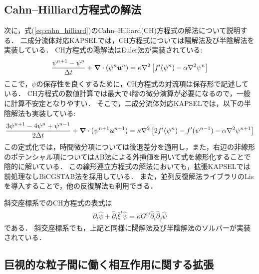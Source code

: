 \documentclass[pdflatex,a4paper,10pt,ja=standard]{bxjsarticle}
\def\vec#1{\mbox{\boldmath $#1$}}
\begin{document}
\subsection{Cahn--Hilliard方程式の解法}
\label{sec:cahn_hilliard_solver}
次に，式(\ref{eq:cahn_hilliard})のCahn--Hilliard(CH)方程式の解法について説明する．
二成分流体対応KAPSELでは，CH方程式については陽解法及び半陰解法を実装している．
CH方程式の陽解法はEuler法が実装されている:
\begin{align}
    \frac{\psi^{n+1} - \psi^{n}}{\Delta t} + \vec{\nabla} \cdot (\psi^{n} \vec{u}^{n}) = \kappa \nabla ^2 \left[f'(\psi^{n}) - \alpha \nabla^2 \psi^{n} \right]
\end{align}
ここで，$\psi$の保存性を良くするために，CH方程式の対流項は保存形で記述している．
CH方程式の数値計算では最大で4階の微分演算が必要になるので，一般に計算不安定となりやすい．
そこで，二成分流体対応KAPSELでは，以下の半陰解法も実装している\autocite{he2007large}:
\begin{align}
    \frac{3\psi^{n+1} - 4\psi^{n} + \psi^{n-1}}{2 \Delta t} + \vec{\nabla} \cdot (\psi^{n+1} \vec{u}^{n+1}) = \kappa \nabla ^2 \left[2f'(\psi^{n}) - f'(\psi^{n-1}) - \alpha \nabla^2 \psi^{n+1} \right]
\end{align}
この定式化では，時間微分項については後退差分を適用し，また，右辺の非線形のポテンシャル項についてはAB法による外挿値を用いて式を線形化することで陰的に解いている．
この線形連立方程式の解法においても，拡張KAPSELでは前処理なしBiCGSTAB法を採用している．
また，並列反復解法ライブラリのLisを導入することで，他の反復解法も利用できる．

斜交座標系でのCH方程式の表式は
\begin{align}
    \partial_{t} \hat{\psi} +  \hat{\partial}_{i} \hat{\xi}^{i} \hat{\psi}
    =  \kappa G^{ij} \hat{\partial}_{i} \hat{\partial}_{j} \hat{\psi}
\end{align}
である．
斜交座標系でも，上記と同様に陽解法及び半陰解法のソルバーが実装されている．

\subsection{巨視的な粒子間に働く相互作用に関する拡張}
\label{sec:dlvo}
\end{document}
